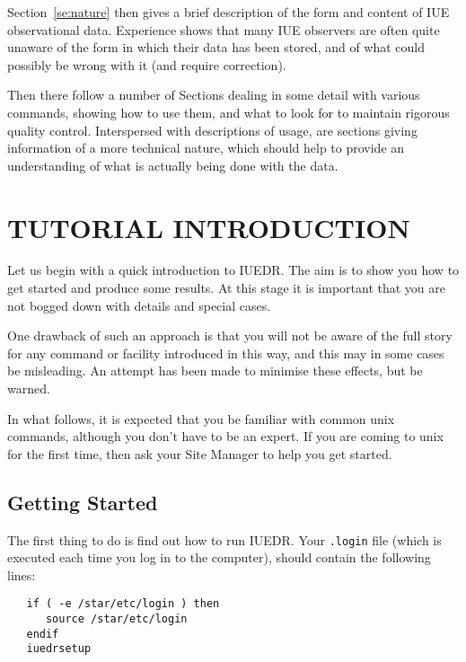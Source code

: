 Section~\ref{se:nature} then gives a brief description of the form and content
of IUE observational data.  Experience shows that many IUE observers are often
quite unaware of the form in which their data has been stored, and of what
could possibly be wrong with it (and require correction)\@.

Then there follow a number of Sections dealing in some detail with various
commands, showing how to use them, and what to look for to maintain
rigorous quality control.  Interspersed with descriptions of usage,
are sections giving information of a more technical nature, which should
help to provide an understanding of what is actually being done with the
data.


\section{\label{se:tutorial}TUTORIAL INTRODUCTION}

Let us begin with a quick introduction to IUEDR\@.  The aim is to show you how
to get started and produce some results.  At this stage it is important that
you are not bogged down with details and special cases.

One drawback of such an approach is that you will not be aware of the full
story for any command or facility introduced in this way, and this may in some
cases be misleading.  An attempt has been made to minimise these effects,
but be warned.

In what follows, it is expected that you be familiar with common unix commands,
although you don't have to be an expert.  If you are coming to unix for the
first time, then ask your Site Manager to help you get started.


\subsection{Getting Started}

The first thing to do is find out how to run IUEDR\@.  Your \verb+.login+ file
(which is executed each time you log in to the computer), should contain the
following lines:

\begin{verbatim}
   if ( -e /star/etc/login ) then
      source /star/etc/login
   endif
   iuedrsetup
\end{verbatim}



